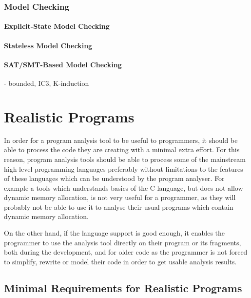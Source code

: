 \subsubsection{Model Checking}

\paragraph{Explicit-State Model Checking}

\paragraph{Stateless Model Checking}

\paragraph{SAT/SMT-Based Model Checking}

- bounded, IC3, K-induction


\section{Realistic Programs} %

In order for a program analysis tool to be useful to programmers, it should be able to process the code they are creating with a minimal extra effort.
For this reason, program analysis tools should be able to process some of the mainstream high-level programming languages preferably without limitations to the features of these languages which can be understood by the program analyser.
For example a tools which understands basics of the C language, but does not allow dynamic memory allocation, is not very useful for a programmer, as they will probably not be able to  use it to analyse their usual programs which contain dynamic memory allocation.

On the other hand, if the language support is good enough, it enables the programmer to use the analysis tool directly on their program or its fragments, both during the development, and for older code as the programmer is not forced to simplify, rewrite or model their code in order to get usable analysis results.

\subsection{Minimal Requirements for Realistic Programs}

